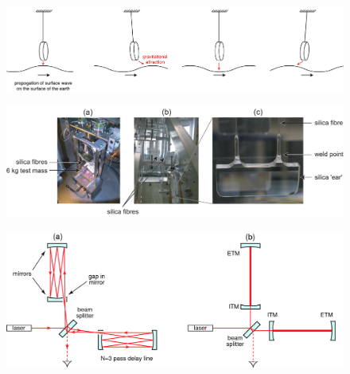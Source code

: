 \documentclass{article}
\begin{document}
\begin{figure}[]
\begin{center}
\includegraphics[width=1\columnwidth]{./figures/GGN/GGN}
\caption{ \protect}
\end{center}
\end{figure}


\begin{figure}[]
\begin{center}
\includegraphics[width=1\columnwidth]{./figures/monolithic/monolithic}
\caption{ \protect}
\end{center}
\end{figure}



\begin{figure}[]
\begin{center}
\includegraphics[width=1\columnwidth]{./figures/fig5e/fig5e}
\caption{ \protect}
\end{center}
\end{figure}
\end{document}
